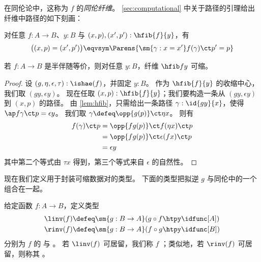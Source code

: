 在同伦论中，这称为 $f$ 的\emph{同伦纤维}。
\cref{sec:computational} 中关于路径的引理给出纤维中路径的如下刻画：

\begin{lem}\label{lem:hfib}
  对任意 $f : A \to B$、$y : B$ 与 $(x,p),(x',p') : \hfib{f}{y}$，有
  \[ \big((x,p) = (x',p')\big) \eqvsym \Parens{\sm{\gamma : x = x'} f(\gamma) \ct p' = p} \qedhere\]
\end{lem}

\begin{thm}\label{thm:contr-hae}
  若 $f:A\to B$ 是半伴随等价，则对任意 $y:B$，纤维 $\hfib f y$ 可缩。
\end{thm}
\begin{proof}
  设 $(g,\eta,\epsilon,\tau) : \ishae(f)$，并固定 $y : B$。
  作为 $\hfib{f}{y}$ 的收缩中心，我们取 $(gy, \epsilon y)$。
  现在任取 $(x,p) : \hfib{f}{y}$；我们要构造一条从 $(gy, \epsilon y)$ 到 $(x,p)$ 的路径。
  由 \cref{lem:hfib}，只需给出一条路径 $\gamma : \id{gy}{x}$，使得 $\ap f\gamma \ct p = \epsilon y$。
  我们取 $\gamma \defeq \opp{g(p)} \ct \eta x$。
  则有
  \begin{align*}
    f(\gamma) \ct p & = \opp{fg(p)} \ct f (\eta x) \ct p \\
    & = \opp{fg(p)} \ct \epsilon(fx) \ct p \\
    & = \epsilon y
  \end{align*}
  其中第二个等式由 $\tau x$ 得到，第三个等式来自 $\epsilon$ 的自然性。
\end{proof}

现在我们定义用于封装可缩数据对的类型。
下面的类型把拟逆 $g$ 与同伦中的一个组合在一起。

\begin{defn}\label{defn:linv-rinv}
  给定函数 $f:A\to B$，定义类型
    \begin{align*}
      \linv(f) &\defeq \sm{g:B\to A} (g\circ f\htpy \idfunc[A])\\
      \rinv(f) &\defeq \sm{g:B\to A} (f\circ g\htpy \idfunc[B])
    \end{align*}
  分别为 $f$ 的
  与
  。
  若 $\linv(f)$ 可居留，我们称 $f$ 
  ；类似地，若 $\rinv(f)$ 可居留，则称其
  。
\end{defn}

